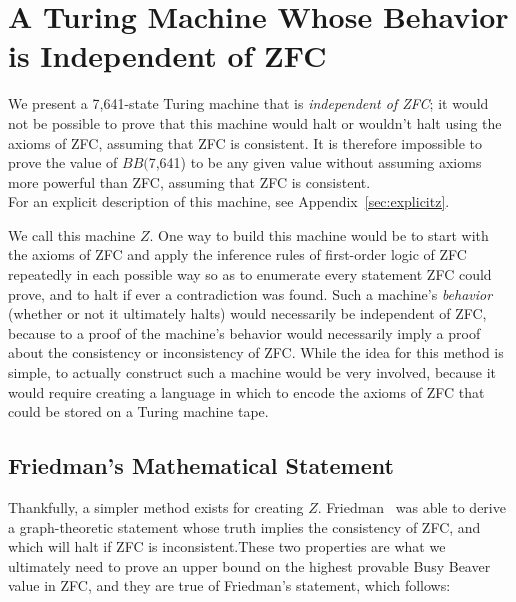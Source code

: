 \documentclass[11pt]{article}
\newcommand{\statenumstate}{7,641-state }
\newcommand{\bbstatenum}{$BB($7,641) }
\begin{document}
\section{A Turing Machine Whose Behavior is Independent of ZFC}

We present a \statenumstate Turing machine that is \emph{independent of ZFC}; it would not be possible to prove that this machine would halt or wouldn't halt using the axioms of ZFC, assuming that ZFC is consistent. It is therefore impossible to prove the value of \bbstatenum to be any given value without assuming axioms more powerful than ZFC, assuming that ZFC is consistent. \\

For an explicit description of this machine, see Appendix~\ref{sec:explicitz}.

We call this machine $Z$. One way to build this machine would be to start with the axioms of ZFC and apply the inference rules of first-order logic of ZFC repeatedly in each possible way so as to enumerate every statement ZFC could prove, and to halt if ever a contradiction was found. Such a machine's \emph{behavior} (whether or not it ultimately halts) would necessarily be independent of ZFC, because to a proof of the machine's behavior would necessarily imply a proof about the consistency or inconsistency of ZFC. While the idea for this method is simple, to actually construct such a machine would be very involved, because it would require creating a language in which to encode the axioms of ZFC that could be stored on a Turing machine tape. \\

\subsection{Friedman's Mathematical Statement}

Thankfully, a simpler method exists for creating $Z$. Friedman~\cite{friedman}
was able to derive a graph-theoretic statement whose truth implies the consistency of ZFC, and which will halt if ZFC is inconsistent.\footnotemark These two properties are what we ultimately need to prove an upper bound on the highest provable Busy Beaver value in ZFC, and they are true of Friedman's statement, which follows: \\
\end{document}
